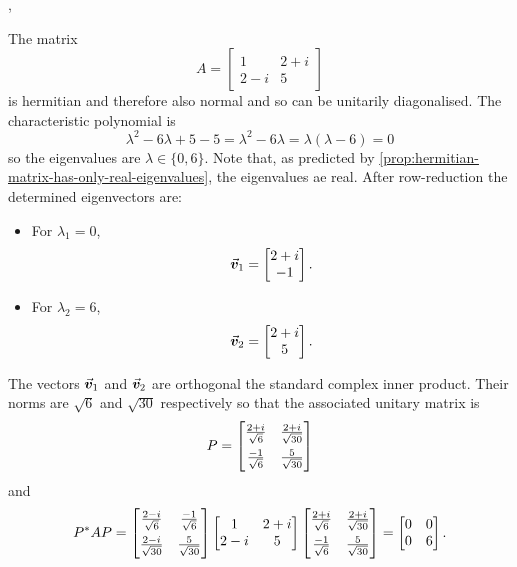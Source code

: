 \documentclass[../MathsNotesBase.tex]{subfiles}
\begin{document}
{		
		\sep
		\begin{exe}
			\item{The matrix
				\[ 
				A = \begin{bmatrix}
					1 & 2 + i\\
					2 - i & 5
				\end{bmatrix} 
				\]
				is hermitian and therefore also normal and so can be unitarily diagonalised. The characteristic polynomial is
				\[ \lambda^2 - 6\lambda + 5 - 5 = \lambda^2 - 6\lambda = \lambda(\lambda - 6) = 0 \]
				so the eigenvalues are ${ \lambda \in \{0, 6\} }$. Note that, as predicted by \autoref{prop:hermitian-matrix-has-only-real-eigenvalues}, the eigenvalues ae real. After row-reduction the determined eigenvectors are:
				\begin{itemize}
					\item{For ${ \lambda_1 = 0 }$,
						\[ \vec{\bm{v}}_1 =  \begin{bmatrix}2 + i\\ -1 \end{bmatrix}. \]
					}
					\item{For ${ \lambda_2 = 6 }$,
						\[ \vec{\bm{v}}_2 =  \begin{bmatrix}2 + i\\ 5 \end{bmatrix}. \]
					}
				\end{itemize}
				The vectors $\vec{\bm{v}}_1$ and $\vec{\bm{v}}_2$ are orthogonal \wrt the standard complex inner product. Their norms are $\sqrt{6}$ and $\sqrt{30}$ respectively so that the associated unitary matrix is
				\[
				P = \begin{bmatrix}
					\frac{2 + i}{\sqrt{6}} & \frac{2 + i}{\sqrt{30}} \nn
					\frac{-1}{\sqrt{6}} & \frac{5}{\sqrt{30}}
				\end{bmatrix} 
				\]
				and
				\[
				P^* A P = 	\begin{bmatrix}
					\frac{2 - i}{\sqrt{6}} & \frac{-1}{\sqrt{6}} \nn
					\frac{2 - i}{\sqrt{30}} & \frac{5}{\sqrt{30}}
				\end{bmatrix}
				\begin{bmatrix}
					1 & 2 + i\\
					2 - i & 5
				\end{bmatrix}
				\begin{bmatrix}
					\frac{2 + i}{\sqrt{6}} & \frac{2 + i}{\sqrt{30}} \nn
					\frac{-1}{\sqrt{6}} & \frac{5}{\sqrt{30}}
				\end{bmatrix} =
				\begin{bmatrix}
					0 & 0\\
					0 & 6
				\end{bmatrix}.
				\]
			}
		\end{exe}
	
}
\end{document}
